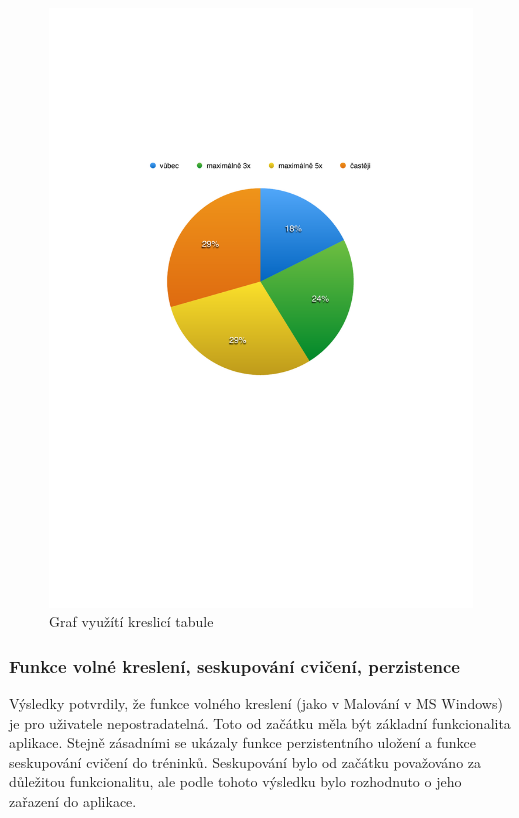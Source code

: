 \documentclass[thesis=B,czech]{FITthesis}[2012/06/26]
\begin{document}
	\begin{figure}
		\centering
		\includegraphics{img/graph_table_usage}
		\caption{Graf využítí kreslicí tabule}\label{graph:table_usage}
	\end{figure}

\subsubsection{Funkce volné kreslení, seskupování cvičení, perzistence}

	Výsledky potvrdily, že funkce volného kreslení (jako v Malování v MS Windows) je pro uživatele nepostradatelná. Toto od začátku měla být základní funkcionalita aplikace. Stejně zásadními se ukázaly funkce perzistentního uložení a funkce seskupování cvičení do tréninků. Seskupování bylo od začátku považováno za důležitou funkcionalitu, ale podle tohoto výsledku bylo rozhodnuto o jeho zařazení do aplikace.
\end{document}
